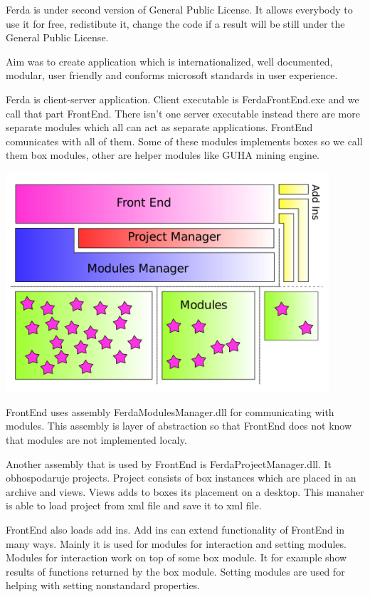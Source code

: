 \documentclass{article}
\begin{document}
Ferda is under second version of General Public License. It allows everybody to use it for free, redistibute it, change the code if a result will be still under the General Public License.

Aim was to create application which is internationalized, well documented, modular, user friendly and conforms microsoft standards in user experience.

Ferda is client-server application. Client executable is FerdaFrontEnd.exe and we call that part FrontEnd. There isn't one server executable instead there are more separate modules which all can act as separate applications. FrontEnd comunicates with all of them. Some of these modules implements boxes so we call them box modules, other are helper modules like GUHA mining engine.

\noindent\includegraphics[width=12cm]{designB}

FrontEnd uses assembly FerdaModulesManager.dll for communicating with modules. This assembly is layer of abstraction so that FrontEnd does not know that modules are not implemented localy.

Another assembly that is used by FrontEnd is FerdaProjectManager.dll. It obhospodaruje projects. Project consists of box instances which are placed in an archive and views. Views adds to boxes its placement on a desktop. This manaher is able to load project from xml file and save it to xml file.

FrontEnd also loads add ins. Add ins can extend functionality of FrontEnd in many ways. Mainly it is used for modules for interaction and setting modules. Modules for interaction work on top of some box module. It for example show results of functions returned by the box module. Setting modules are used for helping with setting nonstandard properties.
\end{document}
